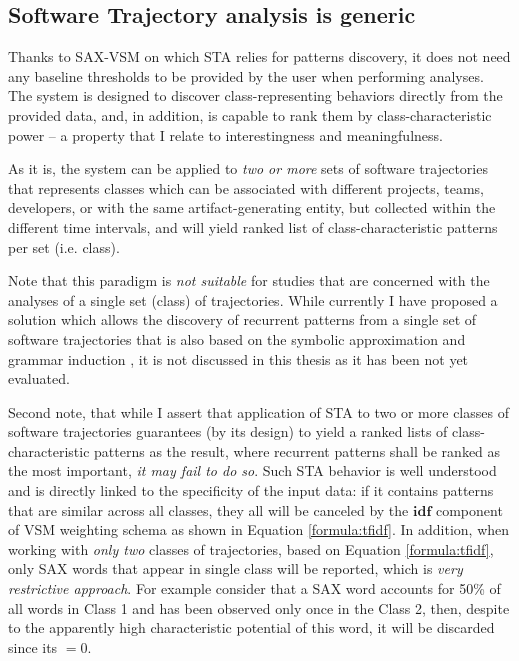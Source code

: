 \subsection{Software Trajectory analysis is generic}
Thanks to \mbox{SAX-VSM} on which STA relies for patterns discovery, it does not need any baseline thresholds to be provided 
by the user when performing analyses. The system is designed to discover class-representing behaviors directly from the provided data, 
and, in addition, is capable to rank them by class-characteristic power -- a property that I relate to interestingness and meaningfulness. 

As it is, the system can be applied to \textit{two or more} sets of software trajectories that represents classes which can be associated 
with different projects, teams, developers, or with the same artifact-generating entity, but collected within the different time intervals, 
and will yield ranked list of class-characteristic patterns per set (i.e. class).

Note that this paradigm is \textit{not suitable} for studies that are concerned with the analyses of a single set (class) 
of trajectories. While currently I have proposed a solution which allows the discovery of recurrent patterns from a single set 
of software trajectories that is also based on the symbolic approximation and grammar induction \cite{grammarviz2}, it is not 
discussed in this thesis as it has been not yet evaluated.

Second note, that while I assert that application of STA to two or more classes of software trajectories guarantees (by its design) 
to yield a ranked lists of class-characteristic patterns as the result, where recurrent patterns shall be ranked as the most 
important, \textit{it may fail to do so}. 
Such STA behavior is well understood and is directly linked to the specificity of the input data: if it contains patterns that are similar 
across all classes, they all will be canceled by the $\textbf{idf}$ component of VSM weighting schema as shown in Equation \eqref{formula:tfidf}. 
In addition, when working with \textit{only two} classes of trajectories, based on Equation \eqref{formula:tfidf}, 
only SAX words that appear in single class will be reported, which is \textit{very restrictive approach}. For example consider
that a SAX word accounts for 50\% of all words in Class 1 and has been observed only once in the Class 2, 
then, despite to the apparently high characteristic potential of this word, it will be discarded since its \tfidf$=0$.

